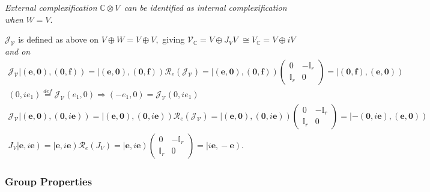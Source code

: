 \documentclass[aps,preprint]{revtex4}
\begin{document}
\emph{External complexification }$\mathbb{C}\otimes V$\emph{\ can be
identified as internal complexification when }$W=V.$

$\mathcal{J}_{\mathcal{V}}$ is defined as above on $V\oplus W=V\oplus V,$
giving $\mathcal{V}_{\mathbb{C}}=V\oplus J_{V}V$ $\cong V_{\mathbb{C}%
}=V\oplus iV$ \emph{and on} 
\begin{gather}
\mathcal{J}_{\mathcal{V}}\left\vert \left( \mathbf{e,0}\right) \mathbf{,}%
\left( \mathbf{0},\mathbf{f}\right) \right) =\left\vert \left( \mathbf{e,0}%
\right) \mathbf{,}\left( \mathbf{0},\mathbf{f}\right) \right) \mathcal{R}%
_{e}\left( \mathcal{J}_{\mathcal{V}}\right) =\left\vert \left( \mathbf{e,0}%
\right) \mathbf{,}\left( \mathbf{0},\mathbf{f}\right) \right) \left( 
\begin{array}{cc}
0 & -\mathbb{I}_{r} \\ 
\mathbb{I}_{r} & 0%
\end{array}
\right) =\left\vert \left( \mathbf{0},\mathbf{f}\right) ,\left( \mathbf{e,0}%
\right) \right) \\
\left( 0,ie_{1}\right) \overset{def}{=}\mathcal{J}_{\mathcal{V}}\left(
e_{1},0\right) \Rightarrow\left( -e_{1},0\right) =\mathcal{J}_{\mathcal{V}%
}\left( 0,ie_{1}\right) \\
\mathcal{J}_{\mathcal{V}}\left\vert \left( \mathbf{e,0}\right) \mathbf{,}%
\left( \mathbf{0},i\mathbf{e}\right) \right) =\left\vert \left( \mathbf{e,0}%
\right) \mathbf{,}\left( \mathbf{0},i\mathbf{e}\right) \right) \mathcal{R}%
_{e}\left( \mathcal{J}_{\mathcal{V}}\right) =\left\vert \left( \mathbf{e,0}%
\right) \mathbf{,}\left( \mathbf{0},i\mathbf{e}\right) \right) \left( 
\begin{array}{cc}
0 & -\mathbb{I}_{r} \\ 
\mathbb{I}_{r} & 0%
\end{array}
\right) =\left\vert -\left( \mathbf{0},i\mathbf{e}\right) ,\left( \mathbf{e,0%
}\right) \right) \\
J_{V}\left\vert \mathbf{e,}i\mathbf{e}\right) =\left\vert \mathbf{e,}i%
\mathbf{e}\right) \mathcal{R}_{e}\left( J_{V}\right) =\left\vert \mathbf{e,}i%
\mathbf{e}\right) \left( 
\begin{array}{cc}
0 & -\mathbb{I}_{r} \\ 
\mathbb{I}_{r} & 0%
\end{array}
\right) =\left\vert i\mathbf{e,}-\mathbf{e}\right) .
\end{gather}

\subsubsection{Group Properties}
\end{document}
